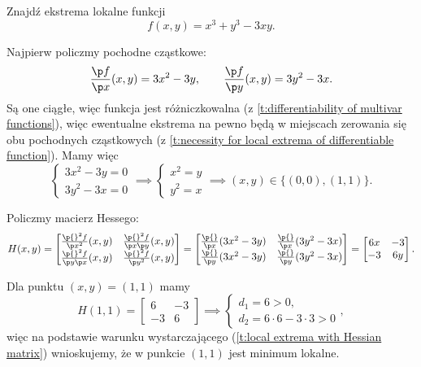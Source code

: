 \begin{example}
    \label{ex:x^3 + y^3 - 3xy}
    Znajdź ekstrema lokalne funkcji
    \[ f(x, y) = x^3 + y^3 - 3xy. \]
\end{example}
\begin{solution}
    Najpierw policzmy pochodne cząstkowe:
    \[ \frac{\p f}{\p x}(x, y) = 3x^2 - 3y, \qquad \frac{\p f}{\p y}(x, y) = 3y^2 - 3x.\]
    Są one ciągłe, więc funkcja jest różniczkowalna (z \ref{t:differentiability of multivar functions}), więc ewentualne ekstrema na pewno będą w miejscach zerowania się obu pochodnych cząstkowych (z \ref{t:necessity for local extrema of differentiable function}). Mamy więc
    \[ \begin{cases} 3x^2 - 3y = 0 \\ 3y^2 - 3x = 0 \end{cases} \implies \begin{cases} x^2 = y \\ y^2 = x \end{cases} \implies (x, y) \in \{(0, 0), (1, 1)\}. \]

    Policzmy macierz Hessego:
    \[ H(x, y) = \begin{bmatrix}
        \frac{\p{}^2 f}{\p x^2}(x, y) & \frac{\p{}^2 f}{\p x \p y}(x, y) \\
        \frac{\p{}^2 f}{\p y \p x}(x, y) & \frac{\p{}^2 f}{\p y^2}(x, y)
    \end{bmatrix} = \begin{bmatrix}
        \frac{\p{} }{\p x}(3x^2 - 3y) & \frac{\p{} }{\p x}(3y^2 - 3x) \\
        \frac{\p{} }{\p y}(3x^2 - 3y) & \frac{\p{} }{\p y}(3y^2 - 3x)
    \end{bmatrix} = \begin{bmatrix}
        6x & -3 \\
        -3 & 6y
    \end{bmatrix}. \]

    Dla punktu $(x, y) = (1, 1)$ mamy
    \[ H(1, 1) = \begin{bmatrix}
        6 & -3 \\
        -3 & 6
    \end{bmatrix} \implies \begin{cases} d_1 = 6 > 0,\\ d_2 = 6\cdot 6 - 3\cdot 3 > 0 \end{cases}, \]
    więc na podstawie warunku wystarczającego (\ref{t:local extrema with Hessian matrix}) wnioskujemy, że w punkcie $(1, 1)$ jest minimum lokalne.


\end{solution}
